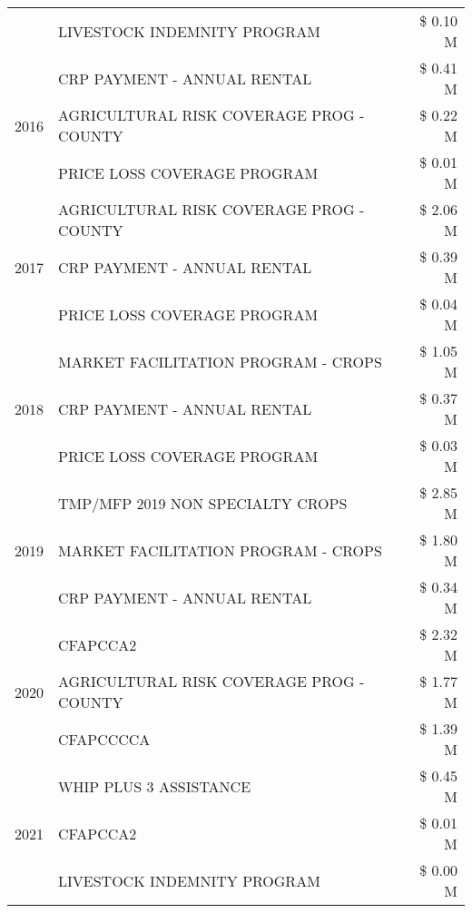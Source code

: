 \begin{tabular}{llr}
 & LIVESTOCK INDEMNITY PROGRAM & \$ 0.10 M \\
\cline{1-3}
\multirow[t]{3}{*}{2016} & CRP PAYMENT - ANNUAL RENTAL & \$ 0.41 M \\
 & AGRICULTURAL RISK COVERAGE PROG - COUNTY & \$ 0.22 M \\
 & PRICE LOSS COVERAGE PROGRAM & \$ 0.01 M \\
\cline{1-3}
\multirow[t]{3}{*}{2017} & AGRICULTURAL RISK COVERAGE PROG - COUNTY & \$ 2.06 M \\
 & CRP PAYMENT - ANNUAL RENTAL & \$ 0.39 M \\
 & PRICE LOSS COVERAGE PROGRAM & \$ 0.04 M \\
\cline{1-3}
\multirow[t]{3}{*}{2018} & MARKET FACILITATION PROGRAM - CROPS & \$ 1.05 M \\
 & CRP PAYMENT - ANNUAL RENTAL & \$ 0.37 M \\
 & PRICE LOSS COVERAGE PROGRAM & \$ 0.03 M \\
\cline{1-3}
\multirow[t]{3}{*}{2019} & TMP/MFP 2019 NON SPECIALTY CROPS & \$ 2.85 M \\
 & MARKET FACILITATION PROGRAM - CROPS & \$ 1.80 M \\
 & CRP PAYMENT - ANNUAL RENTAL & \$ 0.34 M \\
\cline{1-3}
\multirow[t]{3}{*}{2020} & CFAPCCA2 & \$ 2.32 M \\
 & AGRICULTURAL RISK COVERAGE PROG - COUNTY & \$ 1.77 M \\
 & CFAPCCCCA & \$ 1.39 M \\
\cline{1-3}
\multirow[t]{3}{*}{2021} & WHIP PLUS 3 ASSISTANCE & \$ 0.45 M \\
 & CFAPCCA2 & \$ 0.01 M \\
 & LIVESTOCK INDEMNITY PROGRAM & \$ 0.00 M \\
\cline{1-3}
\bottomrule
\end{tabular}
